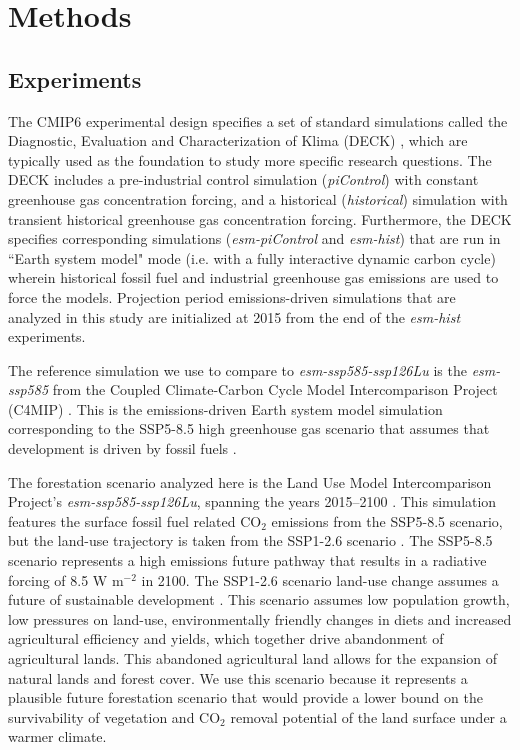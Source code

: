 \documentclass[draft]{agujournal2019}
\begin{document}
\section{Methods}

\subsection{Experiments}

The CMIP6 experimental design specifies a set of standard simulations called the Diagnostic, Evaluation and Characterization of Klima (DECK) \cite{eyring_overview_2016}, which are typically used as the foundation to study more specific research questions.
The DECK includes a pre-industrial control simulation (\textit{piControl}) with constant greenhouse gas concentration forcing, and a historical (\textit{historical}) simulation with transient historical greenhouse gas concentration forcing.
Furthermore, the DECK specifies corresponding simulations (\textit{esm-piControl} and \textit{esm-hist}) that are run in ``Earth system model" mode (i.e. with a fully interactive dynamic carbon cycle) wherein historical fossil fuel and industrial greenhouse gas emissions are used to force the models.
Projection period emissions-driven simulations that are analyzed in this study are initialized at 2015 from the end of the \textit{esm-hist} experiments.

The reference simulation we use to compare to \textit{esm-ssp585-ssp126Lu} is the \textit{esm-ssp585} from the Coupled Climate-Carbon Cycle Model Intercomparison Project (C4MIP) \cite{jones_c4mip_2016}.
This is the emissions-driven Earth system model simulation corresponding to the SSP5-8.5 high greenhouse gas scenario that assumes that development is driven by fossil fuels \cite{oneill_scenario_2016}.

The forestation scenario analyzed here is the Land Use Model Intercomparison Project's \textit{esm-ssp585-ssp126Lu}, spanning the years 2015--2100 \cite{lawrence_land_2016}.
This simulation features the surface fossil fuel related CO$_{2}$ emissions from the SSP5-8.5 scenario, but the land-use trajectory is taken from the SSP1-2.6 scenario \cite{oneill_scenario_2016}.
The SSP5-8.5 scenario represents a high emissions future pathway that results in a radiative forcing of 8.5 W m$^{-2}$ in 2100.
The SSP1-2.6 scenario land-use change assumes a future of sustainable development \cite{van_vuuren_energy_2017}.
This scenario assumes low population growth, low pressures on land-use, environmentally friendly changes in diets and increased agricultural efficiency and yields, which together drive abandonment of agricultural lands.
This abandoned agricultural land allows for the expansion of natural lands and forest cover.
We use this scenario because it represents a plausible future forestation scenario that would provide a lower bound on the survivability of vegetation and CO$_2$ removal potential of the land surface under a warmer climate.
\end{document}
